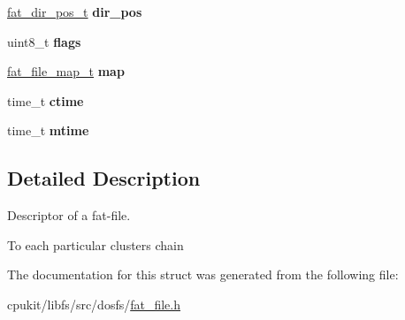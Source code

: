 \begin{DoxyCompactItemize}
\mbox{\hyperlink{structfat__dir__pos__s}{fat\+\_\+dir\+\_\+pos\+\_\+t}} {\bfseries dir\+\_\+pos}
\item 
\mbox{\label{structfat__file__fd__s_a4d66dfae8afebbe7a393fef5774ad3c6}} 
uint8\+\_\+t {\bfseries flags}
\item 
\mbox{\label{structfat__file__fd__s_a720e5647c8304f023ceecced0dcad50c}} 
\mbox{\hyperlink{group__libfs__ff_gab16eea01f8ddea275cd616cc28082ff8}{fat\+\_\+file\+\_\+map\+\_\+t}} {\bfseries map}
\item 
\mbox{\label{structfat__file__fd__s_a7281b20f3756e362be5b1b9c7e30a404}} 
time\+\_\+t {\bfseries ctime}
\item 
\mbox{\label{structfat__file__fd__s_a7905dab478197019a3462552b58aba63}} 
time\+\_\+t {\bfseries mtime}
\end{DoxyCompactItemize}


\subsection{Detailed Description}
Descriptor of a fat-\/file. 

To each particular clusters chain 

The documentation for this struct was generated from the following file\+:\begin{DoxyCompactItemize}
\item 
cpukit/libfs/src/dosfs/\mbox{\hyperlink{fat__file_8h}{fat\+\_\+file.\+h}}\end{DoxyCompactItemize}
